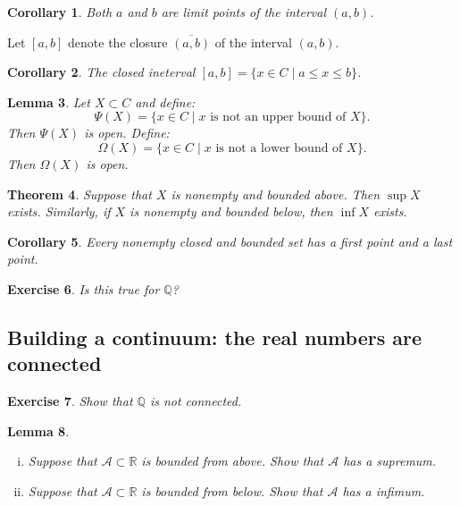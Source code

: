 \documentclass{amsart}
\newtheorem{theorem}{Theorem}
\newtheorem{lemma}[theorem]{Lemma}
\newtheorem{corollary}[theorem]{Corollary}
\newtheorem{exercise}[theorem]{Exercise}
\newcommand{\Q}{\mathbb Q}
\newcommand{\R}{\mathbb R}
\newcommand{\1}{\mathds{1}}
\newcommand{\cA}{\mathcal A}
\newcommand{\cB}{\mathcal B}
\def \R {{\mathbb {R}}}
\numberwithin{equation}{section}
\numberwithin{theorem}{section}
\begin{document}
\begin{corollary}  Both $a$ and $b$ are limit points of the interval $(a,b)$.
\end{corollary}

Let $[a, b]$ denote the closure $\overline{(a,b)}$ of the interval $(a,b)$.  

\begin{corollary}
The closed ineterval $[a, b] = \{x \in C \mid a \leq x \leq b  \}$.
\end{corollary}



\begin{lemma}  Let $X \subset C$ and define:
\[
\Psi(X) = \{ x \in C \mid \text{$x$ is not an upper bound of $X$} \}.
\]
Then $\Psi(X)$ is open.
Define:
\[
\Omega(X) = \{ x \in C \mid \text{$x$ is not a lower bound of $X$} \}.
\]
Then $\Omega(X)$ is open.
\end{lemma}


\begin{theorem}  Suppose that $X$ is nonempty and bounded above. Then $\sup X$ exists. Similarly, if $X$ is nonempty and bounded below, then $\inf X$ exists.
\end{theorem}

\begin{corollary}  Every nonempty closed and bounded set has a first point and a last point.
\end{corollary}


\begin{exercise}  Is this true for $\mathbb{Q}$?
\end{exercise}




\subsection{Building a continuum: the real numbers are connected}

\begin{exercise}
	Show that $\Q$ is not connected.
\end{exercise}



%	
\begin{lemma}
	\begin{enumerate}[(i)]
		\item Suppose that $\cA \subset \R$ is bounded from above.  Show that $\cA$ has a supremum.
		\item Suppose that $\cA \subset \R$ is bounded from below.  Show that $\cA$ has a infimum.
	\end{enumerate}
\end{lemma}
\end{document}
